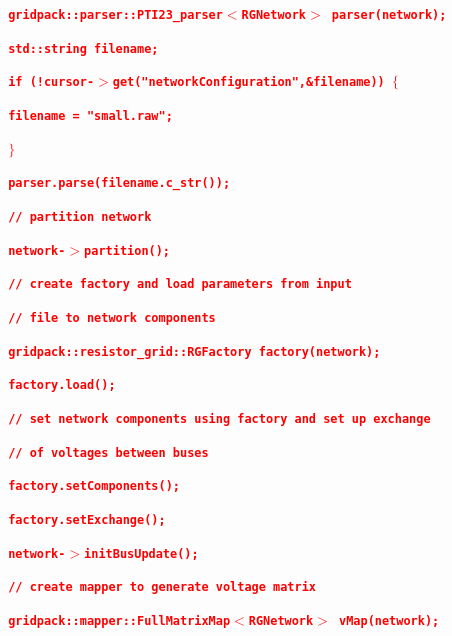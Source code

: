 \documentclass[12pt]{report} %
\begin{document}
\textcolor{red}{\texttt{\textbf{  gridpack::parser::PTI23\_parser$\boldsymbol{\mathrm{<}}$RGNetwork$\boldsymbol{\mathrm{>}}$ parser(network);}}}

\textcolor{red}{\texttt{\textbf{  std::string filename;}}}

\textcolor{red}{\texttt{\textbf{  if (!cursor-$\boldsymbol{\mathrm{>}}$get("networkConfiguration",\&filename)) $\boldsymbol{\mathrm{\{}}$}}}

\textcolor{red}{\texttt{\textbf{    filename = "small.raw";}}}

\textcolor{red}{\texttt{\textbf{  $\boldsymbol{\mathrm{\}}}$}}}

\textcolor{red}{\texttt{\textbf{  parser.parse(filename.c\_str());}}}

\textcolor{red}{\texttt{\textbf{}}}

\textcolor{red}{\texttt{\textbf{  // partition network}}}

\textcolor{red}{\texttt{\textbf{  network-$\boldsymbol{\mathrm{>}}$partition();}}}

\textcolor{red}{\texttt{\textbf{}}}

\textcolor{red}{\texttt{\textbf{  // create factory and load parameters from input}}}

\textcolor{red}{\texttt{\textbf{  // file to network components}}}

\textcolor{red}{\texttt{\textbf{  gridpack::resistor\_grid::RGFactory factory(network);}}}

\textcolor{red}{\texttt{\textbf{  factory.load();}}}

\textcolor{red}{\texttt{\textbf{}}}

\textcolor{red}{\texttt{\textbf{  // set network components using factory and set up exchange}}}

\textcolor{red}{\texttt{\textbf{  // of voltages between buses}}}

\textcolor{red}{\texttt{\textbf{  factory.setComponents();}}}

\textcolor{red}{\texttt{\textbf{  factory.setExchange();}}}

\textcolor{red}{\texttt{\textbf{  network-$\boldsymbol{\mathrm{>}}$initBusUpdate();}}}

\textcolor{red}{\texttt{\textbf{}}}

\textcolor{red}{\texttt{\textbf{  // create mapper to generate voltage matrix}}}

\textcolor{red}{\texttt{\textbf{  gridpack::mapper::FullMatrixMap$\boldsymbol{\mathrm{<}}$RGNetwork$\boldsymbol{\mathrm{>}}$ vMap(network);}}}
\end{document}
